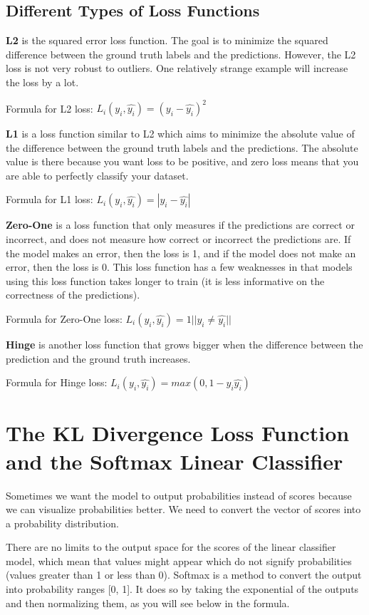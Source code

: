 \documentclass{article}
\begin{document}
\subsection{Different Types of Loss Functions}

\textbf{L2} is the squared error loss function. The goal is to minimize the squared difference between the ground truth labels and the predictions. However, the L2 loss is not very robust to outliers. One relatively strange example will increase the loss by a lot.

Formula for L2 loss: $L_i(y_i, \hat{y_i}) = (y_i - \hat{y_i})^2$

\textbf{L1} is a loss function similar to L2 which aims to minimize the absolute value of the difference between the ground truth labels and the predictions. The absolute value is there because you want loss to be positive, and zero loss means that you are able to perfectly classify your dataset.

Formula for L1 loss: $L_i(y_i, \hat{y_i}) = |y_i - \hat{y_i}|$

\textbf{Zero-One} is a loss function that only measures if the predictions are correct or incorrect, and does not measure how correct or incorrect the predictions are. If the model makes an error, then the loss is 1, and if the model does not make an error, then the loss is 0. This loss function has a few weaknesses in that models using this loss function takes longer to train (it is less informative on the correctness of the predictions).

Formula for Zero-One loss: $L_i(y_i, \hat{y_i}) = 1||y_i \neq \hat{y_i}||$

\textbf{Hinge} is another loss function that grows bigger when the difference between the prediction and the ground truth increases.

Formula for Hinge loss: $L_i(y_i, \hat{y_i}) = max(0, 1-y_i\hat{y_i})$

\section{The KL Divergence Loss Function and the Softmax Linear Classifier}

Sometimes we want the model to output probabilities instead of scores because we can visualize probabilities better. We need to convert the vector of scores into a probability distribution.

There are no limits to the output space for the scores of the linear classifier model, which mean that values might appear which do not signify probabilities (values greater than 1 or less than 0). Softmax is a method to convert the output into probability ranges [0, 1]. It does so by taking the exponential of the outputs and then normalizing them, as you will see below in the formula. 
\end{document}
